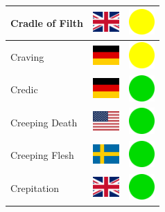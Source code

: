 \documentclass[12pt, a4paper, twoside]{report}
\begin{document}
\begin{center}
\begin{longtable}{|p{5cm}|p{2cm}|p{2cm}|}
 Cradle of Filth                                            & \includegraphics[width=1cm]{../img/flags/gb} &   \includegraphics[width=1cm]{../likes/m} \\ \hline
 Craving                                                    & \includegraphics[width=1cm]{../img/flags/de} &   \includegraphics[width=1cm]{../likes/m} \\ \hline
 Credic                                                     & \includegraphics[width=1cm]{../img/flags/de} &   \includegraphics[width=1cm]{../likes/y} \\ \hline
 Creeping Death                                             & \includegraphics[width=1cm]{../img/flags/us} &   \includegraphics[width=1cm]{../likes/y} \\ \hline
 Creeping Flesh                                             & \includegraphics[width=1cm]{../img/flags/se} &   \includegraphics[width=1cm]{../likes/y} \\ \hline
 Crepitation                                                & \includegraphics[width=1cm]{../img/flags/gb} &   \includegraphics[width=1cm]{../likes/y} \\ \hline

\end{longtable}
\end{center}
\end{document}
